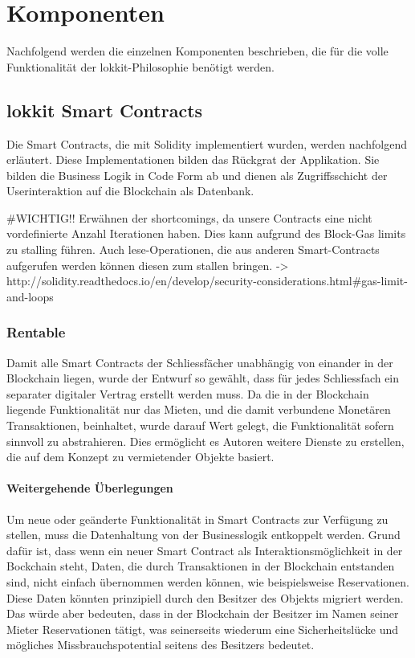\section{Komponenten}
\label{sec:Komponenten}
Nachfolgend werden die einzelnen Komponenten beschrieben, die für die volle Funktionalität der lokkit-Philosophie benötigt werden.

\subsection{lokkit Smart Contracts}
\label{subsec:lokkit_Smart_Contracts}
Die Smart Contracts, die mit Solidity implementiert wurden, werden nachfolgend erläutert. Diese Implementationen bilden das Rückgrat der Applikation. Sie bilden die Business Logik in Code Form ab und dienen als Zugriffsschicht der Userinteraktion auf die Blockchain als Datenbank.

\#WICHTIG!!
Erwähnen der shortcomings, da unsere Contracts eine nicht vordefinierte Anzahl Iterationen haben. Dies kann aufgrund des Block-Gas limits zu stalling führen. Auch lese-Operationen, die aus anderen Smart-Contracts aufgerufen werden können diesen zum stallen bringen. -> http://solidity.readthedocs.io/en/develop/security-considerations.html\#gas-limit-and-loops

\subsubsection{Rentable}
Damit alle Smart Contracts der Schliessfächer unabhängig von einander in der Blockchain liegen, wurde der Entwurf so gewählt, dass für jedes Schliessfach ein separater digitaler Vertrag erstellt werden muss. Da die in der Blockchain liegende Funktionalität nur das Mieten, und die damit verbundene Monetären Transaktionen, beinhaltet, wurde darauf Wert gelegt, die Funktionalität sofern sinnvoll zu abstrahieren. Dies ermöglicht es Autoren weitere Dienste zu erstellen, die auf dem Konzept zu vermietender Objekte basiert.
\paragraph{Weitergehende Überlegungen}
Um neue oder geänderte Funktionalität in Smart Contracts zur Verfügung zu stellen, muss die Datenhaltung von der Businesslogik entkoppelt werden. Grund dafür ist, dass wenn ein neuer Smart Contract als Interaktionsmöglichkeit in der Bockchain steht, Daten, die durch Transaktionen in der Blockchain entstanden sind, nicht einfach übernommen werden können, wie beispielsweise Reservationen. Diese Daten könnten prinzipiell durch den Besitzer des Objekts migriert werden. Das würde aber bedeuten, dass in der Blockchain der Besitzer im Namen seiner Mieter Reservationen tätigt, was seinerseits wiederum eine Sicherheitslücke und mögliches Missbrauchspotential seitens des Besitzers bedeutet.

